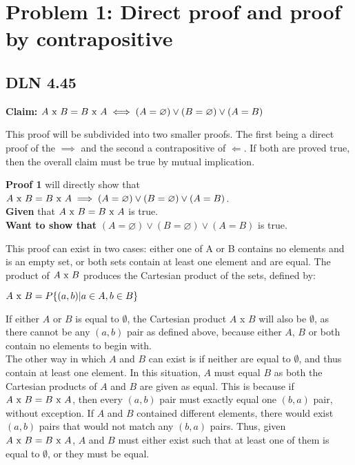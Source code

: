 \documentclass[titlepage]{article}
\begin{document}
 \maketitle

\section{Problem 1: Direct proof and proof by contrapositive}

\subsection{DLN 4.45}  %

\textbf{Claim:} \(A $ x $ B = B $ x $ A \iff (A= \varnothing) \lor (B= \varnothing) \lor (A=B)\)

This proof will be subdivided into two smaller proofs. The first being a direct proof of the $\implies$
and the second a contrapositive of $\Longleftarrow$. If both are proved true, then the overall claim must be true by mutual implication.

\textbf{Proof 1} will directly show that \(A $ x $ B = B $ x $ A \implies (A= \varnothing) \lor (B= \varnothing) \lor (A=B)\).\\
\textbf{Given} that \(A $ x $ B = B $ x $ A \) is true.\\
\textbf{Want to show that} \((A= \varnothing) \lor (B= \varnothing) \lor (A=B)\) is true.

This proof can exist in two cases: either one of A or B contains no elements and is an empty set, or both sets contain at least one element and are equal. The product of \(A $ x $ B\) produces the Cartesian product of the sets, defined by:
\begin{center}
\(A $ x $ B = P\{(a,b)|a \in A, b \in B\} \)
\end{center}
If either $A$ or $B$ is equal to $\emptyset$, the Cartesian product $A $ x $B$ will also be $\emptyset$, as there cannot be any $(a,b)$ pair as defined above, because either $A$, $B$ or both contain no elements to begin with.\\
The other way in which $A$ and $B$ can exist is if neither are equal to $\emptyset$, and thus contain at least one element. In this situation, $A$ must equal $B$ as both the Cartesian products of $A$ and $B$ are given as equal. This is because if \(A $ x $ B = B $ x $ A \), then every $(a,b)$ pair must exactly equal one $(b,a)$ pair, without exception. If $A$ and $B$ contained different elements, there would exist $(a,b)$ pairs that would not match any $(b,a)$ pairs. Thus, given \(A $ x $ B = B $ x $ A \), $A$ and $B$ must either exist such that at least one of them is equal to $\emptyset$, or they must be equal.
\end{document}
